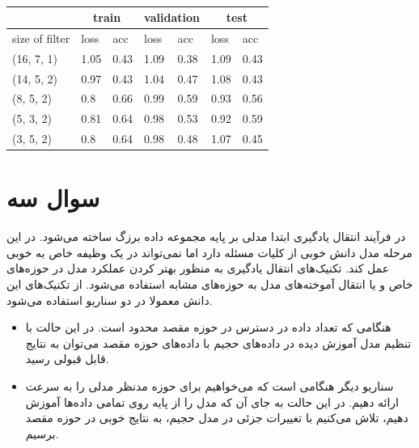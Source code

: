 \documentclass[12pt, a4paper]{article}
\begin{document}
\begin{latin}
\begin{table}[h]
    \centering
    \caption{}
    \label{impact_of_filter_size_on_lenet}
    \begin{tabular}{l||l|l||l|l||l|l}
        & \multicolumn{2}{c||}{train} & \multicolumn{2}{c||}{validation} & \multicolumn{2}{c}{test}\\ \hline
        size of filter & loss & acc & loss & acc & loss & acc \\ \hline
        (16, 7, 1) & 1.05 & 0.43 & 1.09 & 0.38 & 1.09 & 0.43 \\ \hline
        (14, 5, 2) & 0.97 & 0.43 & 1.04 & 0.47 & 1.08 & 0.43 \\ \hline
        (8, 5, 2) & 0.8 & 0.66 & 0.99 & 0.59 & 0.93 & 0.56 \\ \hline
        (5, 3, 2) & 0.81 & 0.64 & 0.98 & 0.53 & 0.92 & 0.59 \\ \hline
        (3, 5, 2) & 0.8 & 0.64 & 0.98 & 0.48 & 1.07 & 0.45 \\ \hline
    \end{tabular}
\end{table}
\end{latin}

\pagebreak

\section*{سوال سه}

در فرآیند انتقال یادگیری ابتدا مدلی بر پایه مجموعه داده برزگ ساخته می‌شود. در این مرحله مدل دانش خوبی از
کلیات مسئله دارد اما نمی‌تواند در یک وظیفه خاص به خوبی عمل کند. تکنیک‌های انتقال یادگیری به منظور بهتر کردن
عملکرد مدل در حوزه‌های خاص و یا انتقال آموخته‌های  مدل به حوزه‌های مشابه استفاده می‌شود. از تکنیک‌های این دانش
معمولا در دو سناریو استفاده می‌شود.

\begin{itemize}
    \item هنگامی که تعداد داده در دسترس در حوزه مقصد محدود است. در این حالت با تنظیم مدل آموزش دیده در داده‌های
    حجیم با داده‌های حوزه مقصد می‌توان به نتایج قابل قبولی رسید.
    \item سناریو دیگر هنگامی است که می‌خواهیم برای حوزه مدنظر مدلی را به سرعت ارائه دهیم. در این حالت
    به جای آن که مدل را از پایه روی تمامی داده‌ها آموزش دهیم، تلاش می‌کنیم با تغییرات جزئی در مدل حجیم،
    به نتایج خوبی در حوزه مقصد برسیم.
\end{itemize}
\end{document}
